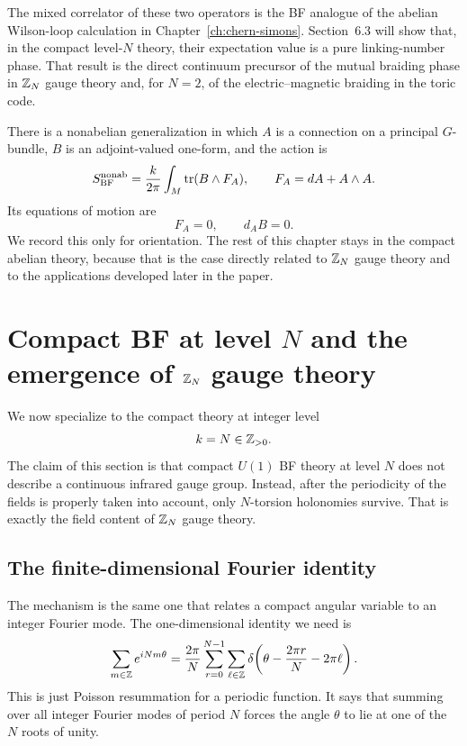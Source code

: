 \noindent The mixed correlator of these two operators is the BF analogue of the abelian Wilson-loop calculation in Chapter~\ref{ch:chern-simons}. Section~6.3 will show that, in the compact level-$N$ theory, their expectation value is a pure linking-number phase. That result is the direct continuum precursor of the mutual braiding phase in $\mathbb{Z}_N$ gauge theory and, for $N=2$, of the electric--magnetic braiding in the toric code.

\begin{remark}\label{rem:nonabelian-bf}
There is a nonabelian generalization in which $A$ is a connection on a principal $G$-bundle, $B$ is an adjoint-valued one-form, and the action is
\begin{equation*}
S_{\mathrm{BF}}^{\mathrm{nonab}}
=
\frac{k}{2\pi}\int_M \operatorname{tr}(B\wedge F_A),
\qquad
F_A = dA + A\wedge A.
\end{equation*}
Its equations of motion are
\begin{equation*}
F_A=0,
\qquad
d_A B = 0.
\end{equation*}
We record this only for orientation. The rest of this chapter stays in the compact abelian theory, because that is the case directly related to $\mathbb{Z}_N$ gauge theory and to the applications developed later in the paper.
\end{remark}

\section{Compact BF at level \texorpdfstring{$N$}{N} and the emergence of \texorpdfstring{$\mathbb{Z}_N$}{Z\_N} gauge theory}\label{sec:bf-zn}

We now specialize to the compact theory at integer level
\begin{equation*}
k=N\in \mathbb{Z}_{>0}.
\end{equation*}
The claim of this section is that compact $U(1)$ BF theory at level $N$ does not describe a continuous infrared gauge group. Instead, after the periodicity of the fields is properly taken into account, only $N$-torsion holonomies survive. That is exactly the field content of $\mathbb{Z}_N$ gauge theory.

\subsection{The finite-dimensional Fourier identity}

The mechanism is the same one that relates a compact angular variable to an integer Fourier mode. The one-dimensional identity we need is
\begin{equation}\label{eq:periodic-delta}
\sum_{m\in \mathbb{Z}} e^{iNm\theta}
=
\frac{2\pi}{N}\sum_{r=0}^{N-1}\sum_{\ell\in \mathbb{Z}}
\delta\!\left(\theta-\frac{2\pi r}{N}-2\pi \ell\right).
\end{equation}
This is just Poisson resummation for a periodic function. It says that summing over all integer Fourier modes of period $N$ forces the angle $\theta$ to lie at one of the $N$ roots of unity.

